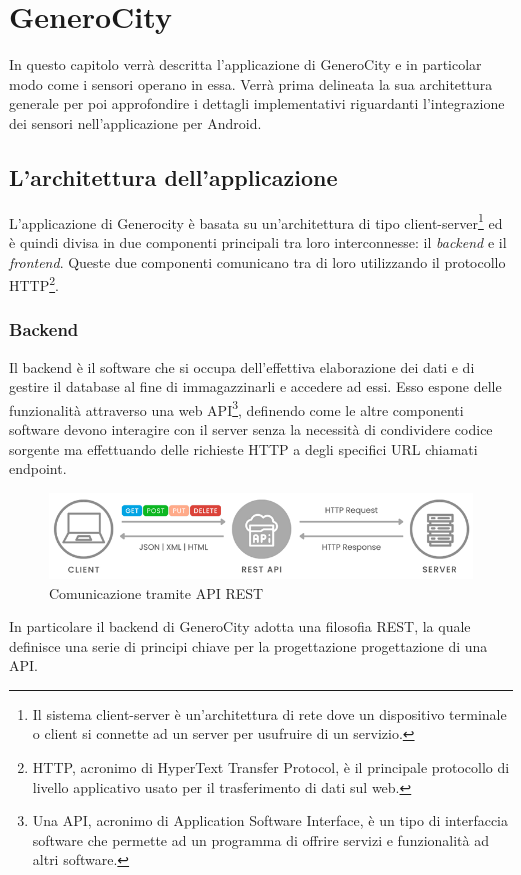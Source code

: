 \chapter{GeneroCity}

In questo capitolo verrà descritta l'applicazione di GeneroCity e in particolar modo come i sensori operano in essa. Verrà prima delineata la sua architettura generale per poi approfondire i dettagli implementativi riguardanti l'integrazione dei sensori nell'applicazione per Android. 

\section{L'architettura dell'applicazione}
L'applicazione di Generocity è basata su un'architettura di tipo client-server\footnote{Il sistema client-server è un'architettura di rete dove un dispositivo terminale o client si connette ad un server per usufruire di un servizio.} ed è quindi divisa in due componenti principali tra loro interconnesse: il \textit{backend} e il \textit{frontend}. Queste due componenti comunicano tra di loro utilizzando il protocollo HTTP\footnote{HTTP, acronimo di HyperText Transfer Protocol, è il principale protocollo di livello applicativo usato per il trasferimento di dati sul web.}.

\subsection{Backend}
Il backend è il software che si occupa dell'effettiva elaborazione dei dati e di gestire il database al fine di immagazzinarli e accedere ad essi. Esso espone delle funzionalità attraverso una web API\footnote{Una API, acronimo di Application Software Interface, è un tipo di interfaccia software che permette ad un programma di offrire servizi e funzionalità ad altri software.}, definendo come le altre componenti software devono interagire con il server senza la necessità di condividere codice sorgente ma effettuando delle richieste HTTP a degli specifici URL chiamati endpoint.
\begin{figure}[h]
    \centering
    \includegraphics[width=1\linewidth]{images/rest.png}
    \caption{Comunicazione tramite API REST}
    \label{fig:rest}
\end{figure}
In particolare il backend di GeneroCity adotta una filosofia REST, la quale definisce una serie di principi chiave per la progettazione progettazione di una API.


